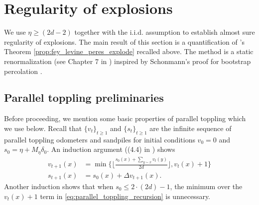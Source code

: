 \documentclass[12pt]{amsart}
\begin{document}
\section{Regularity of explosions} \label{sec:fast_explosions}
We use $\eta \geq (2 d- 2)$ together with the i.i.d. assumption to establish almost sure regularity of explosions. 
The main result of this section is a quantification of \cite{fey2010growth}'s Theorem \ref{prop:fey_levine_peres_explode} recalled above. 
The method is a static renormalization (see Chapter 7 in \cite{grimmett2013percolation}) inspired by Schonmann's proof for bootstrap percolation \cite{schonmann1992behavior}. 



\subsection{Parallel toppling preliminaries}
Before proceeding, we mention some basic properties of parallel toppling which we use below. Recall that $\{v_t\}_{t \geq 1}$ and $\{s_t\}_{t \geq 1}$ are the infinite sequence of parallel toppling odometers and sandpiles for initial conditions $v_0 = 0$ and  $s_0 = \eta + M_{\eta}  \delta_0$.
An induction argument ((4.4) in \cite{babai2007sandpile}) shows
\begin{equation} \label{eq:parallel_toppling_recursion}
\begin{aligned}
v_{t+1}(x) &= \min \{ \lfloor \frac{ s_0(x) + \sum_{y \sim x} v_{t}(y)}{2 d} \rfloor, v_t(x) + 1\} \\
s_{t+1}(x) &= s_0(x) + \Delta v_{t+1}(x).
\end{aligned}
\end{equation}
Another induction shows that when $s_0 \leq 2 \cdot (2 d) - 1$, the minimum over the $v_t(x) + 1$ term in  \eqref{eq:parallel_toppling_recursion}
is unnecessary. 
\end{document}
